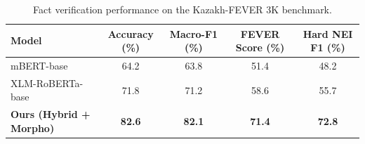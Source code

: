 \begin{table}[ht]
\centering
\small
\caption{Fact verification performance on the Kazakh-FEVER 3K benchmark.}
\label{tab:main_results}
\begin{tabular}{lcccc}
\toprule
\textbf{Model} & \textbf{Accuracy (\%)} & \textbf{Macro-F1 (\%)} & \textbf{FEVER Score (\%)} & \textbf{Hard NEI F1 (\%)} \\
\midrule
mBERT-base & 64.2 & 63.8 & 51.4 & 48.2 \\
XLM-RoBERTa-base & 71.8 & 71.2 & 58.6 & 55.7 \\
\textbf{Ours (Hybrid + Morpho)} & \textbf{82.6} & \textbf{82.1} & \textbf{71.4} & \textbf{72.8} \\
\bottomrule
\end{tabular}
\end{table}
